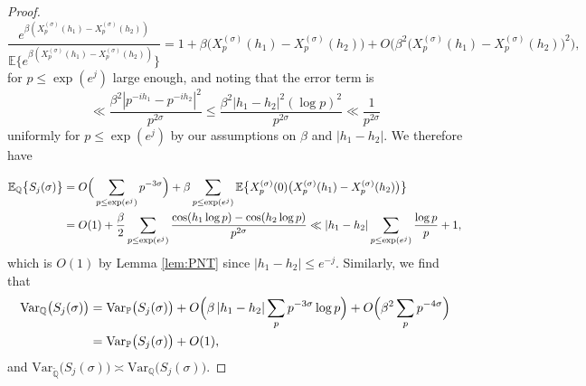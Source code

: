 \documentclass[10pt,a4paper]{amsart}
\begin{document}
\begin{proof}
\[
    \frac{e^{\beta (X_p^{(\sigma)}(h_1)-X_p^{(\sigma)}(h_2))}}{\mathbb{E}\big\{e^{\beta (X_p^{(\sigma)}(h_1)-X_p^{(\sigma)}(h_2))}\big\}}=1+\beta \big(X_p^{(\sigma)}(h_1)-X_p^{(\sigma)}(h_2)\big)+O\Big(\beta^2 \big(X_p^{(\sigma)}(h_1)-X_p^{(\sigma)}(h_2)\big)^2\Big),
\]
for $p\leq \exp(e^j)$ large enough, and noting that the error term is
\[
   \ll  \frac{\beta^2|p^{-ih_1}-p^{-ih_2}|^2}{p^{2\sigma}} \leq \frac{\beta^2|h_1-h_2|^2(\log p)^2}{p^{2\sigma}} \ll \frac{1}{p^{2\sigma}}
\]
uniformly for $p\leq \exp(e^j)$ by our assumptions on $\beta$ and $|h_1-h_2|$. We therefore have

\begin{align}\label{eq:meanshift}
    \mathbb{E}_{\mathbb{Q}}\big\{S_j(\sigma)\big\} 
    &= O\Big(\sum_{p\leq \exp(e^j)} p^{-3\sigma}\Big)+\beta\sum_{p\leq \exp(e^j)} \mathbb{E}\big\{X_p^{(\sigma)}(0)\big(X_p^{(\sigma)}(h_1)-X_p^{(\sigma)}(h_2)\big)\big\}\notag\\
    &=O(1)+\frac{\beta}{2}\sum_{p\leq \exp(e^j)}
    \frac{\cos(h_1\log p)-\cos(h_2\log p)}{p^{2\sigma}}  \ll |h_1-h_2|\sum_{p\leq \exp(e^j)} \frac{\log p}{p} +1,
\end{align}
which is $O(1)$ by Lemma \ref{lem:PNT} since $|h_1-h_2|\leq e^{-j}$. Similarly, we find that
\begin{align}
    \mathrm{Var}_{\mathbb{Q}}\big(S_j(\sigma)\big)
    &= \mathrm{Var}_{\mathbb{P}}\big(S_j(\sigma)\big)
    + O\Big(\beta\,|h_1-h_2|\sum_{p} p^{-3\sigma}\log p\Big)
    + O\Big(\beta^2\sum_{p} p^{-4\sigma}\Big) \notag\\
    &= \mathrm{Var}_{\mathbb{P}}\big(S_j(\sigma)\big) + O(1),\label{eq:Qvar}
\end{align}
and $\mathrm{Var}_{\tilde{\mathbb{Q}}}\big(S_j(\sigma)\big)\asymp \mathrm{Var}_{\mathbb{Q}}\big(S_j(\sigma)\big)$.
\qedhere
\end{proof}
\end{document}
